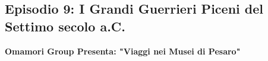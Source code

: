\documentclass[hidelinks,12pt,a4paper]{article}
\begin{document}
\begin{flushleft}
		\subsection{Episodio 9: I Grandi Guerrieri Piceni del Settimo secolo a.C.}
		\begin{center}
			\textbf{Omamori Group Presenta: "Viaggi nei Musei di Pesaro"}
		\end{center}
		
		\vspace*{\fill}
		\doclicenseThis
	\end{flushleft}
\end{document}
